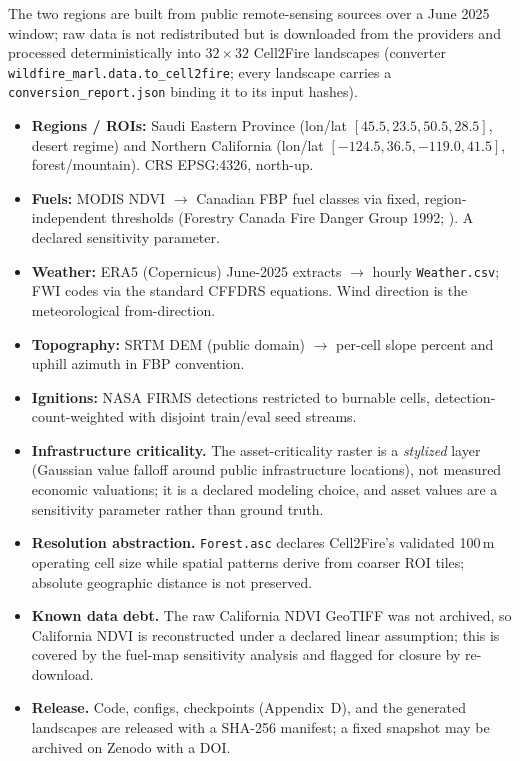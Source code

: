 \documentclass[letterpaper]{article}
\begin{document}
The two regions are built from public remote-sensing sources over a June 2025 window; raw data is not redistributed but is downloaded from the providers and processed deterministically into $32\times32$ Cell2Fire landscapes (converter \texttt{wildfire\_marl.data.to\_cell2fire}; every landscape carries a \texttt{conversion\_report.json} binding it to its input hashes).

\begin{itemize}
    \item \textbf{Regions / ROIs:} Saudi Eastern Province (lon/lat $[45.5, 23.5, 50.5, 28.5]$, desert regime) and Northern California (lon/lat $[-124.5, 36.5, -119.0, 41.5]$, forest/mountain). CRS EPSG:4326, north-up.
    \item \textbf{Fuels:} MODIS NDVI $\rightarrow$ Canadian FBP fuel classes via fixed, region-independent thresholds (Forestry Canada Fire Danger Group 1992; \citealp{pais2021cell2fire}). A declared sensitivity parameter.
    \item \textbf{Weather:} ERA5 (Copernicus) June-2025 extracts $\rightarrow$ hourly \texttt{Weather.csv}; FWI codes via the standard CFFDRS equations. Wind direction is the meteorological from-direction.
    \item \textbf{Topography:} SRTM DEM (public domain) $\rightarrow$ per-cell slope percent and uphill azimuth in FBP convention.
    \item \textbf{Ignitions:} NASA FIRMS detections restricted to burnable cells, detection-count-weighted with disjoint train/eval seed streams.
    \item \textbf{Infrastructure criticality.} The asset-criticality raster is a \emph{stylized} layer (Gaussian value falloff around public infrastructure locations), not measured economic valuations; it is a declared modeling choice, and asset values are a sensitivity parameter rather than ground truth.
    \item \textbf{Resolution abstraction.} \texttt{Forest.asc} declares Cell2Fire's validated 100\,m operating cell size while spatial patterns derive from coarser ROI tiles; absolute geographic distance is not preserved.
    \item \textbf{Known data debt.} The raw California NDVI GeoTIFF was not archived, so California NDVI is reconstructed under a declared linear assumption; this is covered by the fuel-map sensitivity analysis and flagged for closure by re-download.
    \item \textbf{Release.} Code, configs, checkpoints (Appendix~D), and the generated landscapes are released with a SHA-256 manifest; a fixed snapshot may be archived on Zenodo with a DOI.
\end{itemize}
\end{document}
